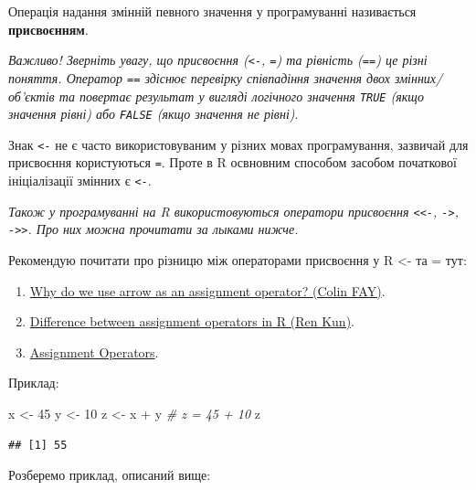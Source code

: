 \documentclass[
]{book}
\newenvironment{Shaded}{\begin{snugshade}}{\end{snugshade}}
\newcommand{\CommentTok}[1]{\textcolor[rgb]{0.56,0.35,0.01}{\textit{#1}}}
\newcommand{\DecValTok}[1]{\textcolor[rgb]{0.00,0.00,0.81}{#1}}
\newcommand{\NormalTok}[1]{#1}
\newcommand{\OtherTok}[1]{\textcolor[rgb]{0.56,0.35,0.01}{#1}}
\newcommand{\SpecialCharTok}[1]{\textcolor[rgb]{0.00,0.00,0.00}{#1}}
\providecommand{\tightlist}{%
  \setlength{\itemsep}{0pt}\setlength{\parskip}{0pt}}
\begin{document}
Операція надання змінній певного значення у програмуванні називається \textbf{присвоєнням}.

\emph{Важливо! Зверніть увагу, що присвоєння (\texttt{\textless{}-}, \texttt{=}) та рівність (\texttt{==}) це різні поняття. Оператор \texttt{==} здіснює перевірку співпадіння значення двох змінних/об'єктів та повертає результат у вигляді логічного значення \texttt{TRUE} (якщо значення рівні) або \texttt{FALSE} (якщо значення не рівні)}.

Знак \texttt{\textless{}-} не є часто використовуваним у різних мовах програмування, зазвичай для присвоєння користуються \texttt{=}. Проте в R освновним способом засобом початкової ініціалізації змінних є \texttt{\textless{}-}.

\emph{Також у програмуванні на R використовуються оператори присвоєння \texttt{\textless{}\textless{}-}, \texttt{-\textgreater{}}, \texttt{-\textgreater{}\textgreater{}}. Про них можна прочитати за лыками нижче.}

Рекомендую почитати про різницю між операторами присвоєння у R \textless- та = тут:

\begin{enumerate}
\def\labelenumi{\arabic{enumi}.}
\tightlist
\item
  \href{https://colinfay.me/r-assignment/}{Why do we use arrow as an assignment operator? (Colin FAY)}.
\item
  \href{https://renkun.me/2014/01/28/difference-between-assignment-operators-in-r/}{Difference between assignment operators in R (Ren Kun)}.
\item
  \href{https://stat.ethz.ch/R-manual/R-devel/library/base/html/assignOps.html}{Assignment Operators}.
\end{enumerate}

Приклад:

\begin{Shaded}
\begin{Highlighting}[]
\NormalTok{x }\OtherTok{\textless{}{-}} \DecValTok{45}
\NormalTok{y }\OtherTok{\textless{}{-}} \DecValTok{10}
\NormalTok{z }\OtherTok{\textless{}{-}}\NormalTok{ x }\SpecialCharTok{+}\NormalTok{ y }\CommentTok{\# z = 45 + 10}
\NormalTok{z}
\end{Highlighting}
\end{Shaded}

\begin{verbatim}
## [1] 55
\end{verbatim}

Розберемо приклад, описаний вище:
\end{document}
